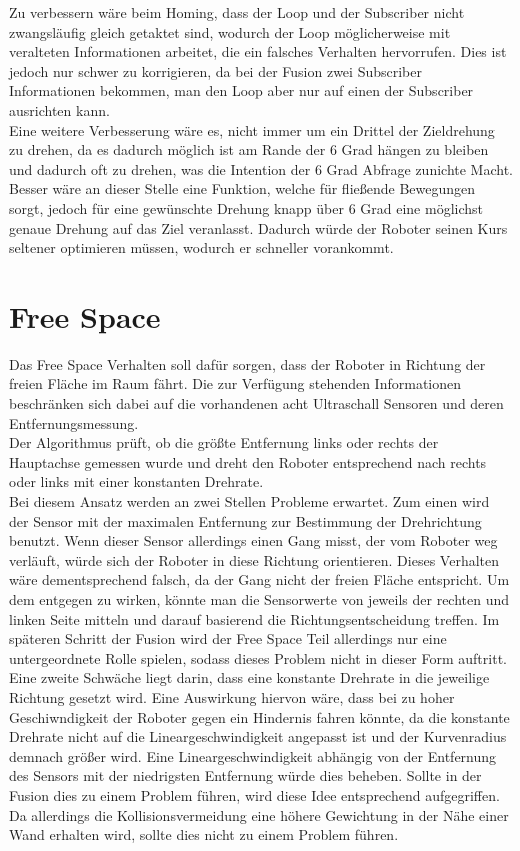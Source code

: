 \documentclass[12pt, a4paper]{report}
\begin{document}
Zu verbessern wäre beim Homing, dass der Loop und der Subscriber nicht zwangsläufig gleich getaktet sind, wodurch der Loop möglicherweise mit veralteten Informationen arbeitet, die ein falsches Verhalten hervorrufen. Dies ist jedoch nur schwer zu korrigieren, da bei der Fusion zwei Subscriber Informationen bekommen, man den Loop aber nur auf einen der Subscriber ausrichten kann.\\
Eine weitere Verbesserung wäre es, nicht immer um ein Drittel der Zieldrehung zu drehen, da es dadurch möglich ist am Rande der 6 Grad hängen zu bleiben und dadurch oft zu drehen, was die Intention der 6 Grad Abfrage zunichte Macht. Besser wäre an dieser Stelle eine Funktion, welche für fließende Bewegungen sorgt, jedoch für eine gewünschte Drehung knapp über 6 Grad eine möglichst genaue Drehung auf das Ziel veranlasst. Dadurch würde der Roboter seinen Kurs seltener optimieren müssen, wodurch er schneller vorankommt.

\section{Free Space}

Das Free Space Verhalten soll dafür sorgen, dass der Roboter in Richtung der freien Fläche im Raum fährt. Die zur Verfügung stehenden Informationen beschränken sich dabei auf die vorhandenen acht Ultraschall Sensoren und deren Entfernungsmessung.
\\
Der Algorithmus prüft, ob die größte Entfernung links oder rechts der Hauptachse gemessen wurde und dreht den Roboter entsprechend nach rechts oder links mit einer konstanten Drehrate. 
\\
Bei diesem Ansatz werden an zwei Stellen Probleme erwartet. Zum einen wird der Sensor mit der maximalen Entfernung zur Bestimmung der Drehrichtung benutzt. Wenn dieser Sensor allerdings einen Gang misst, der vom Roboter weg verläuft, würde sich der Roboter in diese Richtung orientieren. Dieses Verhalten wäre dementsprechend falsch, da der Gang nicht der freien Fläche entspricht. Um dem entgegen zu wirken, könnte man die Sensorwerte von jeweils der rechten und linken Seite mitteln und darauf basierend die Richtungsentscheidung treffen. Im späteren Schritt der Fusion wird der Free Space Teil allerdings nur eine untergeordnete Rolle spielen, sodass dieses Problem nicht in dieser Form auftritt.\\
Eine zweite Schwäche liegt darin, dass eine konstante Drehrate in die jeweilige Richtung gesetzt wird. Eine Auswirkung hiervon wäre, dass bei zu hoher Geschiwndigkeit der Roboter gegen ein Hindernis fahren könnte, da die konstante Drehrate nicht auf die Lineargeschwindigkeit angepasst ist und der Kurvenradius demnach größer wird. Eine Lineargeschwindigkeit abhängig von der Entfernung des Sensors mit der niedrigsten Entfernung würde dies beheben. Sollte in der Fusion dies zu einem Problem führen, wird diese Idee entsprechend aufgegriffen. Da allerdings die Kollisionsvermeidung eine höhere Gewichtung in der Nähe einer Wand erhalten wird, sollte dies nicht zu einem Problem führen.
\end{document}
